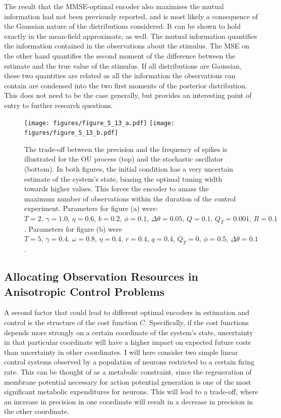 The result that the MMSE-optimal encoder also maximises the mutual information had not been previously reported, and is most likely a consequence of the Gaussian
nature of the distributions considered. It can be shown to hold exactly in the mean-field approximate, as well. The mutual information quantifies the information contained in the observations about the stimulus. The MSE on the other hand
quantifies the second moment of the difference between the estimate and the true value of the stimulus. If all distributions are Gaussian, these two quantities are related
as all the information the observations can contain are condensed into the two first moments of the posterior distribution. This does not need to be the case generally,
but provides an interesting point of entry to further research questions.
\par
\begin{figure}
\texttt{[image: figures/figure\_5\_13\_a.pdf]}
\texttt{[image: figures/figure\_5\_13\_b.pdf]}
\caption[Trading off precision and frequency in control and estimation problems.]{{The trade-off between the precision and the frequency of spikes is illustrated for the OU process (top) and the stochastic oscillator (bottom). In both figures, the initial condition has a very uncertain estimate of the system's state, biasing the optimal tuning width towards higher values. This forces the encoder to amass the maximum number of observations within the duration of the control experiment. Parameters for figure (a)
were: $T =2,\, \gamma = 1.0,\, \eta = 0.6,\, b = 0.2,\, \phi = 0.1,\, \Delta\theta = 0.05,\, Q = 0.1,\, Q_T = 0.001,\, R = 0.1$.  Parameters for figure (b) were $T=5,\,
\gamma=0.4,\,\omega=0.8,\,\eta = 0.4,\, r=0.4,\, q=0.4,\, Q_T = 0,\, \phi = 0.5,\, \Delta\theta=0.1$.   }}
\label{fig:comparison_uni}
\end{figure}


\subsection{Allocating Observation Resources in Anisotropic Control Problems}
\label{sec:determinant}

A second factor that could lead to different optimal encoders in estimation and control is the structure of the cost function $C$. Specifically, if the cost functions
depends more strongly on a certain coordinate of the system's state, uncertainty in that particular coordinate will have a higher impact on expected future costs than
uncertainty in other coordinates. I will here consider two simple linear control systems observed by a population of neurons restricted to a certain firing rate. This
can be thought of as a metabolic constraint, since the regeneration of membrane potential necessary for action potential generation is one of the most significant
metabolic expenditures for neurons. This will lead to a trade-off, where an increase in precision in one coordinate will result in a decrease in
precision in the other coordinate.\par

